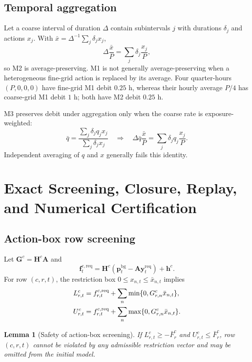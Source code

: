 \documentclass[10pt,journal,onecolumn]{IEEEtran}
\newtheorem{lemma}{Lemma}[section]
\begin{document}
\subsection{Temporal aggregation}

Let a coarse interval of duration $\Delta$ contain subintervals $j$ with
durations $\delta_j$ and actions $x_j$. With
$\bar x=\Delta^{-1}\sum_j\delta_jx_j$,
\begin{equation}
\Delta\frac{\bar x}{P}
=\sum_j\delta_j\frac{x_j}{P},
\end{equation}
so M2 is average-preserving. M1 is not generally average-preserving when a
heterogeneous fine-grid action is replaced by its average. Four quarter-hours
$(P,0,0,0)$ have fine-grid M1 debit $0.25$ h, whereas their hourly average
$P/4$ has coarse-grid M1 debit $1$ h; both have M2 debit $0.25$ h.

M3 preserves debit under aggregation only when the coarse rate is
exposure-weighted:
\begin{equation}
\bar q
=\frac{\sum_j\delta_jq_jx_j}{\sum_j\delta_jx_j}
\quad\Longrightarrow\quad
\Delta\bar q\frac{\bar x}{P}
=\sum_j\delta_jq_j\frac{x_j}{P}.
\end{equation}
Independent averaging of $q$ and $x$ generally fails this identity.

\section{Exact Screening, Closure, Replay, and Numerical Certification}
\label{sec:report_certification}

\subsection{Action-box row screening}

Let $\bm G^c=\bm H^c\bm A$ and
\begin{equation}
\bm f_t^{c,\mathrm{req}}
=\bm H^c(\bm p_t^{\mathrm{bg}}-\bm A\bm y_t^{\mathrm{req}})+\bm h^c.
\end{equation}
For row $(c,r,t)$, the restriction box
$0\leq x_{n,t}\leq\bar x_{n,t}$ implies
\begin{align}
L_{r,t}^c
&=f_{r,t}^{c,\mathrm{req}}
+\sum_n\min\{0,G_{r,n}^c\bar x_{n,t}\},
\notag\\
U_{r,t}^c
&=f_{r,t}^{c,\mathrm{req}}
+\sum_n\max\{0,G_{r,n}^c\bar x_{n,t}\}.
\label{eq:report_screen_bounds}
\end{align}

\begin{lemma}[Safety of action-box screening]
If $L_{r,t}^c\geq-\bar F_r^c$ and
$U_{r,t}^c\leq\bar F_r^c$, row $(c,r,t)$ cannot be violated by any admissible
restriction vector and may be omitted from the initial model.
\end{lemma}
\end{document}
